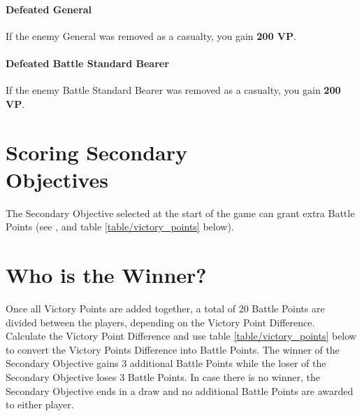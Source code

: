 \paragraph{Defeated General}

If the enemy General was removed as a casualty, you gain \textbf{200 VP}.

\paragraph{Defeated Battle Standard Bearer}

If the enemy Battle Standard Bearer was removed as a casualty, you gain \textbf{200 VP}.

\section[Scoring Secondary Objectives]{Scoring Secondary\\ Objectives}
\label{scoring_secondary_objectives}

The Secondary Objective selected at the start of the game can grant extra Battle Points (see , and table \ref{table/victory_points} below).

\section{Who is the Winner?}
\label{who_is_the_winner}

Once all Victory Points are added together, a total of 20 Battle Points are divided between the players, depending on the Victory Point Difference. Calculate the Victory Point Difference and use table \ref{table/victory_points} below to convert the Victory Points Difference into Battle Points.
The winner of the Secondary Objective gains 3 additional Battle Points while the loser of the Secondary Objective loses 3 Battle Points. In case there is no winner, the Secondary Objective ends in a draw and no additional Battle Points are awarded to either player.

